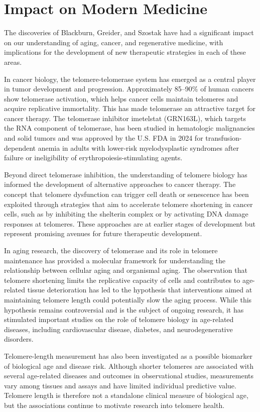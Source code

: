 \section{Impact on Modern Medicine}

The discoveries of Blackburn, Greider, and Szostak have had a significant impact on our understanding of aging, cancer, and regenerative medicine, with implications for the development of new therapeutic strategies in each of these areas.

In cancer biology, the telomere-telomerase system has emerged as a central player in tumor development and progression. Approximately 85--90\% of human cancers show telomerase activation, which helps cancer cells maintain telomeres and acquire replicative immortality. This has made telomerase an attractive target for cancer therapy. The telomerase inhibitor imetelstat (GRN163L), which targets the RNA component of telomerase, has been studied in hematologic malignancies and solid tumors and was approved by the U.S. FDA in 2024 for transfusion-dependent anemia in adults with lower-risk myelodysplastic syndromes after failure or ineligibility of erythropoiesis-stimulating agents.

Beyond direct telomerase inhibition, the understanding of telomere biology has informed the development of alternative approaches to cancer therapy. The concept that telomere dysfunction can trigger cell death or senescence has been exploited through strategies that aim to accelerate telomere shortening in cancer cells, such as by inhibiting the shelterin complex or by activating DNA damage responses at telomeres. These approaches are at earlier stages of development but represent promising avenues for future therapeutic development.

In aging research, the discovery of telomerase and its role in telomere maintenance has provided a molecular framework for understanding the relationship between cellular aging and organismal aging. The observation that telomere shortening limits the replicative capacity of cells and contributes to age-related tissue deterioration has led to the hypothesis that interventions aimed at maintaining telomere length could potentially slow the aging process. While this hypothesis remains controversial and is the subject of ongoing research, it has stimulated important studies on the role of telomere biology in age-related diseases, including cardiovascular disease, diabetes, and neurodegenerative disorders.

Telomere-length measurement has also been investigated as a possible biomarker of biological age and disease risk. Although shorter telomeres are associated with several age-related diseases and outcomes in observational studies, measurements vary among tissues and assays and have limited individual predictive value. Telomere length is therefore not a standalone clinical measure of biological age, but the associations continue to motivate research into telomere health.

